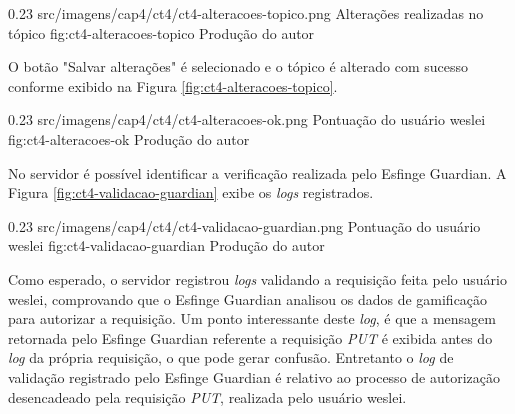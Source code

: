 \begin{image}
{0.23}
{src/imagens/cap4/ct4/ct4-alteracoes-topico.png}
{Alterações realizadas no tópico}
{fig:ct4-alteracoes-topico}
{Produção do autor}
\end{image}

\par O botão "Salvar alterações" é selecionado e o tópico é alterado com sucesso conforme exibido na Figura \ref{fig:ct4-alteracoes-topico}.

\begin{image}
{0.23}
{src/imagens/cap4/ct4/ct4-alteracoes-ok.png}
{Pontuação do usuário weslei}
{fig:ct4-alteracoes-ok}
{Produção do autor}
\end{image}

\par No servidor é possível identificar a verificação realizada pelo Esfinge Guardian. A Figura \ref{fig:ct4-validacao-guardian} exibe os \textit{logs} registrados.

\begin{image}
{0.23}
{src/imagens/cap4/ct4/ct4-validacao-guardian.png}
{Pontuação do usuário weslei}
{fig:ct4-validacao-guardian}
{Produção do autor}
\end{image}

\par Como esperado, o servidor registrou \textit{logs} validando a requisição feita pelo usuário weslei, comprovando que o Esfinge Guardian analisou os dados de gamificação para autorizar a requisição. Um ponto interessante deste \textit{log}, é que a mensagem retornada pelo Esfinge Guardian referente a requisição \textit{PUT} é exibida antes do \textit{log} da própria requisição, o que pode gerar confusão. Entretanto o \textit{log} de validação registrado pelo Esfinge Guardian é relativo ao processo de autorização desencadeado pela requisição \textit{PUT}, realizada pelo usuário weslei.




